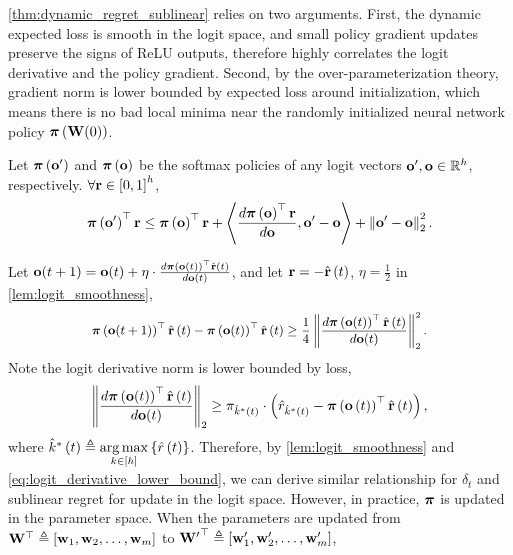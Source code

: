 \cref{thm:dynamic_regret_sublinear} relies on two arguments. First, the dynamic expected loss is smooth in the logit space, and small policy gradient updates preserve the signs of ReLU outputs, therefore highly correlates the logit derivative and the policy gradient. Second, by the over-parameterization theory, gradient norm is lower bounded by expected loss around initialization, which means there is no bad local minima near the randomly initialized neural network policy ${\boldsymbol{\pi}}\left( {\mathbf{W}}(0) \right)$.

\begin{lem}
\label{lem:logit_smoothness}
Let ${\boldsymbol{\pi}}\left( {\mathbf{o}}^\prime \right)$ and ${\boldsymbol{\pi}}\left( {\mathbf{o}} \right)$ be the softmax policies of any logit vectors ${\mathbf{o}}^\prime, {\mathbf{o}} \in {\mathbb{R}}^h$, respectively. $\forall {\mathbf{r}} \in \left[ 0, 1\right]^h$,
\begin{equation*}
    {\boldsymbol{\pi}}\left( {\mathbf{o}}^\prime \right)^\top {\mathbf{r}} \le {\boldsymbol{\pi}}\left( {\mathbf{o}} \right)^\top {\mathbf{r}} + \left\langle \frac{d {\boldsymbol{\pi}}\left( {\mathbf{o}} \right)^\top {\mathbf{r}}}{d {\mathbf{o}}}, {\mathbf{o}}^\prime - {\mathbf{o}} \right\rangle + \left\| {\mathbf{o}}^\prime - {\mathbf{o}} \right\|_2^2.
\end{equation*}
\end{lem}
Let ${\mathbf{o}}(t+1) = {\mathbf{o}}(t) + \eta \cdot \frac{d {\boldsymbol{\pi}}\left( {\mathbf{o}}(t) \right)^\top \hat{{\mathbf{r}}}\left(t\right)}{d {\mathbf{o}}(t)}$, and let ${\mathbf{r}} = - \hat{{\mathbf{r}}}\left(t\right)$, $\eta = \frac{1}{2}$ in \cref{lem:logit_smoothness},
\begin{equation*}
\begin{split}
\small
    \rvpi\left( \rvo(t+1) \right)^\top \hat{\rvr}\left(t\right) - \rvpi\left( \rvo(t) \right)^\top \hat{\rvr}\left(t\right) \ge\frac{1}{4} \left\| \frac{d \rvpi\left( \rvo(t) \right)^\top \hat{\rvr}\left(t\right)}{d \rvo(t)} \right\|_2^2.
\end{split}
\end{equation*}
Note the logit derivative norm is lower bounded by loss,
\begin{equation}
\label{eq:logit_derivative_lower_bound}
\begin{split}
    \left\| \frac{d {\boldsymbol{\pi}}\left( {\mathbf{o}}(t) \right)^\top \hat{{\mathbf{r}}}\left(t\right)}{d {\mathbf{o}}(t)} \right\|_2 \ge \pi_{\hat{k}^*\left(t\right)} \cdot \left( \hat{r}_{\hat{k}^*\left(t\right)} - {\boldsymbol{\pi}}\left( {\mathbf{o}}\left(t\right) \right)^\top \hat{{\mathbf{r}}}\left(t\right) \right),
\end{split}
\end{equation}
where $\hat{k}^*\left(t\right) \triangleq \operatorname*{arg\,max}\limits_{ k \in [h]}{\left\{ \hat{r}\left(t\right) \right\}}$. Therefore, by \cref{lem:logit_smoothness} and \cref{eq:logit_derivative_lower_bound}, we can derive similar relationship for $\delta_t$ and sublinear regret for update in the logit space. However, in practice, ${\boldsymbol{\pi}}$ is updated in the parameter space. When the parameters are updated from ${\mathbf{W}}^\top \triangleq \left[ {\mathbf{w}}_1, {\mathbf{w}}_2, \dots, {\mathbf{w}}_m \right]$ to ${{\mathbf{W}}^\prime}^\top \triangleq \left[ {\mathbf{w}}_1^\prime, {\mathbf{w}}_2^\prime, \dots, {\mathbf{w}}_m^\prime \right]$,

